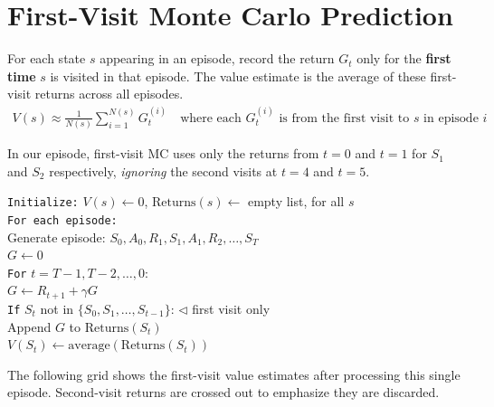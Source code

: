 \documentclass[journal, onecolumn]{IEEEtran}
\newcommand{\vocab}[1]{\textbf{\textcolor{Garnet}{#1}}}
\begin{document}
\section{First-Visit Monte Carlo Prediction}

\begin{tcolorbox}[memorybox={Definition: First-Visit MC}]
For each state $s$ appearing in an episode, record the return $G_t$ only for the \vocab{first time} $s$ is visited in that episode. The value estimate is the average of these first-visit returns across all episodes.
\begin{align}
    V(s) \approx \frac{1}{N(s)} \sum_{i=1}^{N(s)} G_t^{(i)} \quad \text{where each } G_t^{(i)} \text{ is from the first visit to } s \text{ in episode } i
\end{align}
\end{tcolorbox}

In our episode, first-visit MC uses only the returns from $t=0$ and $t=1$ for $S_1$ and $S_2$ respectively, \textit{ignoring} the second visits at $t=4$ and $t=5$.

\begin{tcolorbox}[examplebox={First-Visit MC Pseudocode}]
\texttt{Initialize:} $V(s) \leftarrow 0$, $\text{Returns}(s) \leftarrow$ empty list, for all $s$\\[4pt]
\texttt{For each episode:}\\
\quad Generate episode: $S_0, A_0, R_1, S_1, A_1, R_2, \ldots, S_T$\\
\quad $G \leftarrow 0$\\
\quad \texttt{For} $t = T-1, T-2, \ldots, 0$:\\
\quad\quad $G \leftarrow R_{t+1} + \gamma G$\\
\quad\quad \texttt{If} $S_t$ not in $\{S_0, S_1, \ldots, S_{t-1}\}$: \hfill \textcolor{Garnet}{$\triangleleft$ first visit only}\\
\quad\quad\quad Append $G$ to $\text{Returns}(S_t)$\\
\quad\quad\quad $V(S_t) \leftarrow \text{average}(\text{Returns}(S_t))$
\end{tcolorbox}

The following grid shows the first-visit value estimates after processing this single episode. Second-visit returns are crossed out to emphasize they are discarded.
\end{document}
